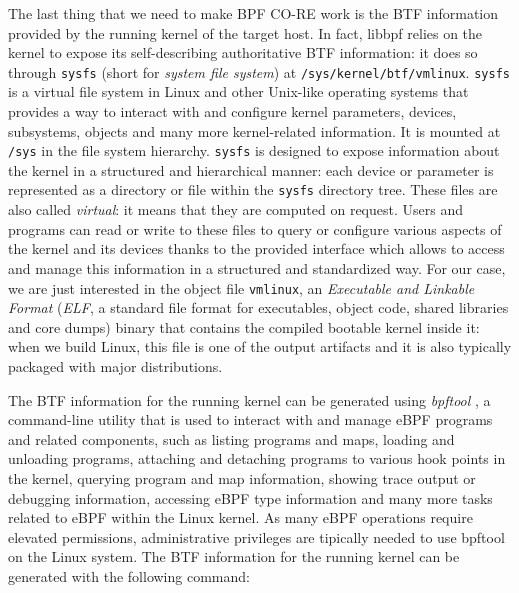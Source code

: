 The last thing that we need to make BPF CO-RE work is the BTF information provided by the running kernel of the target host.
In fact, libbpf relies on the kernel to expose its self-describing authoritative BTF information: it does so through \colorbox{backcolour}{\lstinline[style=commandline, language=bash, breaklines=true]|sysfs|} (short for \textit{system file system}) at \colorbox{backcolour}{\lstinline[style=commandline, language=bash, breaklines=true]|/sys/kernel/btf/vmlinux|}.
\colorbox{backcolour}{\lstinline[style=commandline, language=bash, breaklines=true]|sysfs|} is a virtual file system in Linux and other Unix-like operating systems that provides a way to interact with and configure kernel parameters, devices, subsystems, objects and many more kernel-related information. 
It is mounted at \colorbox{backcolour}{\lstinline[style=commandline, language=bash, breaklines=true]|/sys|} in the file system hierarchy.
\colorbox{backcolour}{\lstinline[style=commandline, language=bash, breaklines=true]|sysfs|} is designed to expose information about the kernel in a structured and hierarchical manner: each device or parameter is represented as a directory or file within the \colorbox{backcolour}{\lstinline[style=commandline, language=bash, breaklines=true]|sysfs|} directory tree. 
These files are also called \textit{virtual}: it means that they are computed on request.
Users and programs can read or write to these files to query or configure various aspects of the kernel and its devices thanks to the provided interface which allows to access and manage this information in a structured and standardized way.
For our case, we are just interested in the object file \colorbox{backcolour}{\lstinline[style=commandline, language=bash, breaklines=true]|vmlinux|}, an \textit{Executable and Linkable Format} (\textit{ELF}, a standard file format for executables, object code, shared libraries and core dumps) binary that contains the compiled bootable kernel inside it: when we build Linux, this file is one of the output artifacts and it is also typically packaged with major distributions. 

The BTF information for the running kernel can be generated using \textit{bpftool} \cite{bpftoolGitHubRepo}, a command-line utility that is used to interact with and manage eBPF programs and related components, such as listing programs and maps, loading and unloading programs, attaching and detaching programs to various hook points in the kernel, querying program and map information, showing trace output or debugging information, accessing eBPF type information and many more tasks related to eBPF within the Linux kernel.
As many eBPF operations require elevated permissions, administrative privileges are tipically needed to use bpftool on the Linux system.
The BTF information for the running kernel can be generated with the following command:

